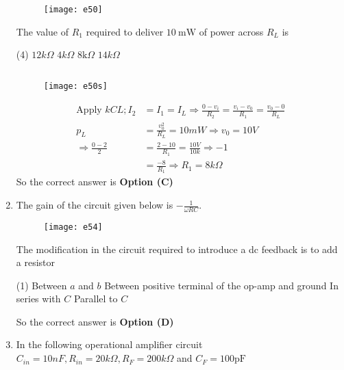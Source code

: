 \begin{enumerate}
	\begin{figure}[H]
		\centering
		\texttt{[image: e50]}
	\end{figure}
	The value of $R_{1}$ required to deliver $10 \mathrm{~mW}$ of power across $R_{L}$ is
	{}
	\begin{tasks}(4)
		\task[\textbf{A.}] $12 k \Omega$
		\task[\textbf{B.}] $4 k \Omega$
		\task[\textbf{C.}]  $8 \mathrm{k} \Omega$
		\task[\textbf{D.}]  $14 k \Omega$
	\end{tasks}  
\begin{answer}$\left. \right. $
	\begin{figure}[H]
		\centering
		\texttt{[image: e50s]}
	\end{figure}
	\begin{align*}
	\text{Apply }k C L ; I_{2}&=I_{1}=I_{L} \Rightarrow \frac{0-v_{i}}{R_{2}}=\frac{v_{i}-v_{0}}{R_{1}}=\frac{v_{0}-0}{R_{L}}\\
	p_{L}&=\frac{v_{0}^{2}}{R_{L}}=10 m W \Rightarrow v_{0}=10 V\\
	\Rightarrow \frac{0-2}{2}&=\frac{2-10}{R_{1}}=\frac{10 V}{10 k} \Rightarrow-1\\&=\frac{-8}{R_{1}} \Rightarrow R_{1}=8 k \Omega
	\end{align*}
	So the correct answer is \textbf{Option (C)}
\end{answer}              
	\item The gain of the circuit given below is $-\frac{1}{\omega R C}$.\\
	\begin{figure}[H]
		\centering
		\texttt{[image: e54]}
	\end{figure}
	The modification in the circuit required to introduce a dc feedback is to add a resistor
	{}
	\begin{tasks}(1)
		\task[\textbf{A.}] Between $a$ and $b$
		\task[\textbf{B.}]  Between positive terminal of the op-amp and ground
		\task[\textbf{C.}] In series with $C$
		\task[\textbf{D.}] Parallel to $C$
	\end{tasks}
\begin{answer}
	So the correct answer is \textbf{Option (D)}
\end{answer}
	\item In the following operational amplifier circuit $C_{i n}=10 n F, R_{i n}=20 k \Omega, R_{F}=200 k \Omega$ and $C_{F}=100 \mathrm{pF}$\\
	\begin{figure}[H]

\end{figure}
\end{enumerate}
